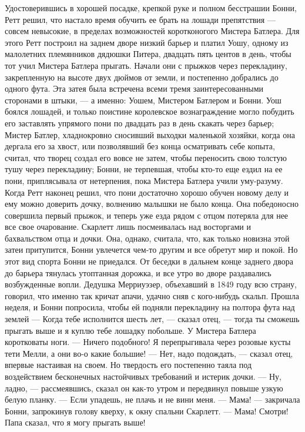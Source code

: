 Удостоверившись в хорошей посадке, крепкой руке и полном бесстрашии Бонни, Ретт решил, что настало время обучить ее брать на лошади препятствия — совсем невысокие, в пределах возможностей коротконогого Мистера Батлера. Для этого Ретт построил на заднем дворе низкий барьер и платил Уошу, одному из малолетних племянников дядюшки Питера, двадцать пять центов в день, чтобы тот учил Мистера Батлера прыгать. Начали они с прыжков через перекладину, закрепленную на высоте двух дюймов от земли, и постепенно добрались до одного фута.
Эта затея была встречена всеми тремя заинтересованными сторонами в штыки, — а именно: Уошем, Мистером Батлером и Бонни. Уош боялся лошадей, и только поистине королевское вознаграждение могло побудить его заставлять упрямого пони по двадцать раз в день скакать через барьер; Мистер Батлер, хладнокровно сносивший выходки маленькой хозяйки, когда она дергала его за хвост, или позволявший без конца осматривать себе копыта, считал, что творец создал его вовсе не затем, чтобы переносить свою толстую тушу через перекладину; Бонни, не терпевшая, чтобы кто-то еще ездил на ее пони, приплясывала от нетерпения, пока Мистера Батлера учили уму-разуму.
Когда Ретт наконец решил, что пони достаточно хорошо обучен новому делу и ему можно доверить дочку, волнению малышки не было конца. Она победоносно совершила первый прыжок, и теперь уже езда рядом с отцом потеряла для нее все свое очарование. Скарлетт лишь посмеивалась над восторгами и бахвальством отца и дочки. Она, однако, считала, что, как только новизна этой затеи притупится, Бонни увлечется чем-то другим и все обретут мир и покой. Но этот вид спорта Бонни не приедался. От беседки в дальнем конце заднего двора до барьера тянулась утоптанная дорожка, и все утро во дворе раздавались возбужденные вопли. Дедушка Мерриуэзер, объехавший в 1849 году всю страну, говорил, что именно так кричат апачи, удачно сняв с кого-нибудь скальп.
Прошла неделя, и Бонни попросила, чтобы ей подняли перекладину на полтора фута над землей — Когда тебе исполнится шесть лет, — сказал отец, — тогда ты сможешь прыгать выше и я куплю тебе лошадку побольше. У Мистера Батлера коротковаты ноги.
— Ничего подобного! Я перепрыгивала через розовые кусты тети Мелли, а они во-о какие большие!
— Нет, надо подождать, — сказал отец, впервые настаивая на своем. Но твердость его постепенно таяла под воздействием бесконечных настойчивых требований и истерик дочки.
— Ну, ладно, — рассмеявшись, сказал он как-то утром и передвинул повыше узкую белую планку. — Если упадешь, не плачь и не вини меня.
— Мама! — закричала Бонни, запрокинув голову кверху, к окну спальни Скарлетт. — Мама! Смотри! Папа сказал, что я могу прыгать выше!
